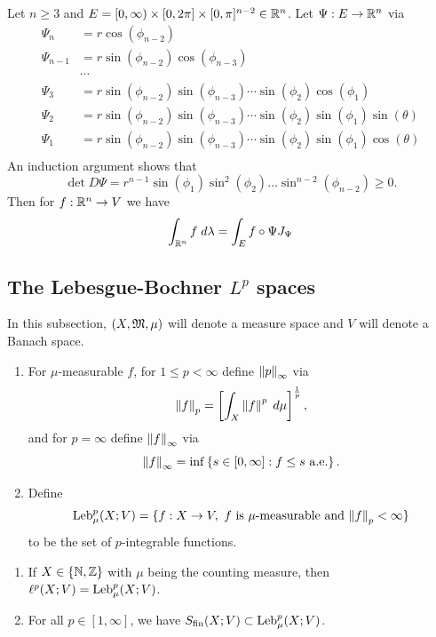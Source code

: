 \documentclass[a4paper]{article}
\begin{document}
\begin{eg}
Let $n \geq 3$ and $E = [0, \infty) \times [0, 2 \pi]
\times [0, \pi]^{n-2} \in \mathbb{R}^n$. Let $\Psi: E \to \mathbb{R}^n$
via
\[
\begin{aligned}
\Psi_n &= r \cos (\phi_{n-2}) \\
\Psi_{n-1} &= r \sin (\phi_{n-2}) \cos (\phi_{n-3}) \\
&\cdots \\
\Psi_3 &= r \sin (\phi_{n-2}) \sin (\phi_{n-3}) \cdots \sin (\phi_2)
\cos (\phi_1) \\
\Psi_2 &= r \sin (\phi_{n-2}) \sin (\phi_{n-3}) \cdots \sin (\phi_2)
\sin (\phi_1) \sin (\theta) \\
\Psi_1 &= r \sin (\phi_{n-2}) \sin (\phi_{n-3}) \cdots \sin (\phi_2)
\sin (\phi_1) \cos (\theta) \\
\end{aligned}
\]
An induction argument shows that
\[
\det D\Psi = r^{n-1} \sin (\phi_1) \sin^2 (\phi_2)
\dots \sin^{n-2} (\phi_{n-2}) \geq 0.
\]
Then for $f : \mathbb{R}^n \to V$ we have
\[
\int_{\mathbb{R}^n} f \; d \lambda = \int_E f \circ \Psi J_{\Psi}
\]
\end{eg}

\subsection{The Lebesgue-Bochner $L^p$ spaces}

In this subsection, $(X, \mathfrak{M}, \mu)$ will denote a measure
space and $V$ will denote a Banach space.

\begin{defi}
\begin{enumerate}
\item For $\mu$-measurable $f$, for $1 \leq p < \infty$
define $\left\lVert p\right\rVert_\infty$ via
\[
\left\lVert f\right\rVert_p = \left[ \int_X \left\lVert f\right\rVert^p \; d \mu \right]^{\frac{1}{p}},
\]
and for $p = \infty$ define $\left\lVert f\right\rVert_\infty$ via
\[
\left\lVert f\right\rVert_\infty = \inf \left\{ s \in [0, \infty] : f
\leq s \text{ a.e.} \right\}.
\]

\item Define
\[
\operatorname{Leb}_\mu^p (X; V) = \{ f : X \to V, \text{ $f$ is $\mu$-measurable
and $\left\lVert f\right\rVert_p < \infty$} \}
\]
to be the set of $p$-integrable functions.
\end{enumerate}
\end{defi}

\begin{eg}
\begin{enumerate}
\item If $X \in \{\mathbb{N}, \mathbb{Z}\}$ with $\mu$ being the counting
measure, then $\ell^p(X; V) = \operatorname{Leb}_\mu^p (X; V)$.

\item For all $p \in [1, \infty]$, we have
$S_{\text{fin}}(X; V) \subset \operatorname{Leb}_\mu^p (X; V)$.
\end{enumerate}
\end{eg}
\end{document}
